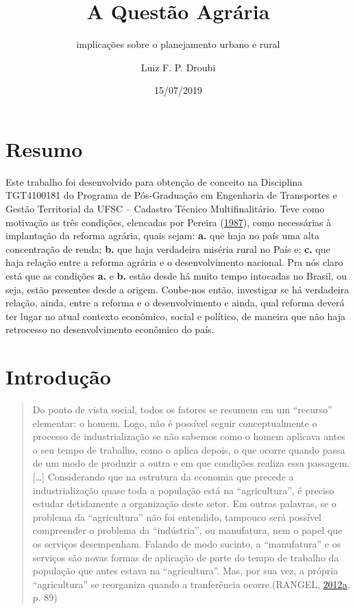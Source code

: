 \documentclass[a4paper, 12pt]{article}
\title{A Questão Agrária}
\subtitle{implicações sobre o planejamento urbano e rural}
\author{Luiz F. P. Droubi}
\date{15/07/2019}
\begin{document}
\maketitle

\hypertarget{resumo}{%
\section*{Resumo}\label{resumo}}

Este trabalho foi desenvolvido para obtenção de conceito na Disciplina
TGT4100181 do Programa de Pós-Graduação em Engenharia de Transportes e
Gestão Territorial da UFSC -- Cadastro Técnico Multifinalitário. Teve
como motivação as três condições, elencadas por Pereira
(\protect\hyperlink{ref-questaoagraria}{1987}), como necessárias à
implantação da reforma agrária, quais sejam: \textbf{a.} que haja no
país uma alta concentração de renda; \textbf{b.} que haja verdadeira
miséria rural no País e; \textbf{c.} que haja relação entre a reforma
agrária e o desenvolvimento nacional. Pra nós claro está que as
condições \textbf{a.} e \textbf{b.} estão desde há muito tempo intocadas
no Brasil, ou seja, estão presentes desde a origem. Coube-nos então,
investigar se há verdadeira relação, ainda, entre a reforma e o
desenvolvimento e ainda, qual reforma deverá ter lugar no atual contexto
econômico, social e político, de maneira que não haja retrocesso no
desenvolvimento econômico do país.

\hypertarget{introducao}{%
\section{Introdução}\label{introducao}}

\begin{quote}
Do ponto de vista social, todos os fatores se resumem em um ``recurso''
elementar: o homem. Logo, não é possível seguir conceptualmente o
processo de industrialização se não sabemos como o homem aplicava antes
o seu tempo de trabalho, como o aplica depois, o que ocorre quando passa
de um modo de produzir a outra e em que condições realiza essa
passagem.{[}\ldots{}{]} Considerando que na estrutura da economia que
precede a industrialização quase toda a população está na
``agricultura'', é preciso estudar detidamente a organização deste
setor. Em outras palavras, se o problema da ``agricultura'' não foi
entendido, tampouco será possível compreender o problema da
``indústria'', ou manufatura, nem o papel que os serviços desempenham.
Falando de modo sucinto, a ``manufatura'' e os serviços são novas formas
de aplicação de parte do tempo de trabalho da população que antes estava
na ``agricultura''. Mas, por sua vez, a própria ``agricultura'' se
reorganiza quando a tranferência ocorre.(RANGEL,
\protect\hyperlink{ref-rangel1954}{2012}\protect\hyperlink{ref-rangel1954}{a},
p. 89)
\end{quote}
\end{document}
